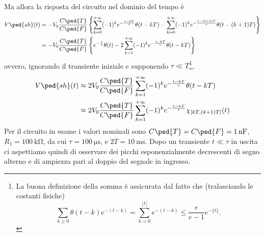 \documentclass[10pt,a4paper]{article}
\begin{document}
Ma allora la risposta del circuito nel dominio del tempo è
\begin{align*}
  V\ped{sh}(t) &= - V_{0} \frac{C\ped{T}}{C\ped{F}} \left\{ 
\sum_{k=0}^{+\infty} (-1)^{k}e^{-\frac{t - kT}{\tau}}\theta(t - kT) - 
\sum_{k=0}^{+\infty} (-1)^{k} e^{-\frac{t- (k+1) T }{\tau}} \theta(t - (k+1)T ) 
\right\} \\
               &= - V_{0} \frac{C\ped{T}}{C\ped{F}} \left\{ e^{-\frac{t}{\tau}} 
\theta(t) - 2 \sum_{k=1}^{+\infty} (-1)^{k} e^{-\frac{t - kT}{\tau}} \theta(t - 
kT) \right\}
\end{align*}
ovvero, ignorando il transiente iniziale e supponendo $ \tau\ll T $\footnote{
La buona definizione della somma è assicurata dal fatto che (tralasciando le 
costanti fisiche)
\[ \sum_{k \geq 0} \theta(t-k) e^{-(t-k)} = \sum_{k=0}^{\lfloor t \rfloor} 
e^{-(t-k)} \leq \frac{e}{e-1} e^{-\{t\}}. \]
},
\begin{align}\label{eq:Vsh}
V\ped{sh}(t) &\approx 2 V_{0} \frac{C\ped{T}}{C\ped{F}} \sum_{k=1}^{+\infty} 
(-1)^{k} e^{-\frac{t - kT}{\tau}} \theta(t - kT) \nonumber\\
               &\approx  2 V_{0} \frac{C\ped{T}}{C\ped{F}} \sum_{k=1}^{+\infty} 
(-1)^{k} e^{-\frac{t - kT}{\tau}} \chi_{[kT, (k+1)T]}(t)
\end{align}
Per il circuito in esame i valori nominali sono $ C\ped{T} = C\ped{F} = 
\SI{1}{\nano\farad} $, $ R_{1} = \SI{100}{\kilo\ohm} $, da cui $ \tau = 
\SI{100}{\micro\second} $, e $ 2T = \SI{10}{\milli\second} $. Dopo un 
transiente $ t\ll\tau $ in uscita ci aspettiamo quindi di osservare dei picchi 
esponenzialmente decrescenti di segno alterno e di ampiezza pari al doppio del 
segnale in ingresso. \\
\end{document}
